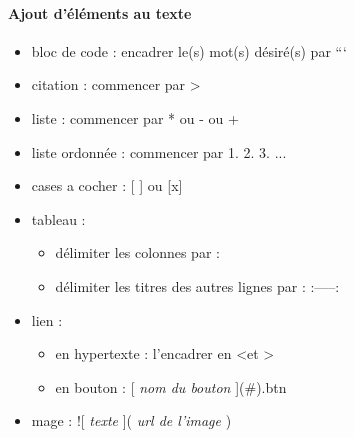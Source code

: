 \paragraph{Ajout d'éléments au texte}
\begin{itemize}
	\item bloc de code : encadrer le(s) mot(s) désiré(s) par ```
	\item citation : commencer par \textgreater
	\item liste : commencer par * ou - ou +
	\item liste ordonnée : commencer par 1. 2. 3. ...
	\item cases a cocher : [ ] ou [x]
	\item tableau :
  \begin{itemize}
    \item délimiter les colonnes par : \textbar
    \item délimiter les titres des autres lignes par : :-----:
  \end{itemize}
	\item lien :
  \begin{itemize}
    \item en hypertexte : l'encadrer en \textless et \textgreater
    \item en bouton : [ \textit{nom du bouton} ](\#){.btn }
  \end{itemize}
	\item mage : ![ \textit{texte} ]( \textit{url de l'image} )
\end{itemize}
